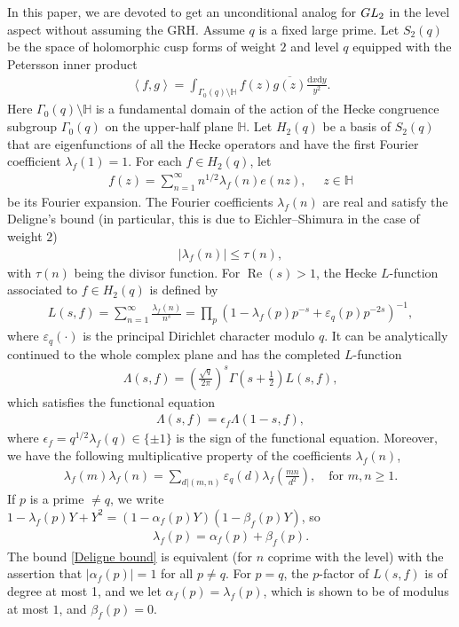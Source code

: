\documentclass[11pt,reqno]{amsart}
\newcommand{\bea}{\begin{eqnarray}}
\newcommand{\eea}{\end{eqnarray}}
\newcommand{\bna}{\begin{eqnarray*}}
\newcommand{\ena}{\end{eqnarray*}}
\numberwithin{equation}{section}
\theoremstyle{plain}
\theoremstyle{definition}
\renewcommand{\Re}{\operatorname{Re}}
\begin{document}
In this paper, we are devoted to get an unconditional analog for $\rm GL_2$ in the level aspect without assuming the GRH.
Assume $q$ is a fixed large prime.
Let $S_2(q)$ be the space of holomorphic cusp forms of weight $2$ and level $q$
equipped with the Petersson inner product
\bna
\left<f,g\right>=\int_{\Gamma_0(q)\setminus\mathbb{H}}f(z)\overline{g(z)}\frac{\mathrm{d}x\mathrm{d}y}{y^2}.
\ena
Here $\Gamma_0(q)\setminus\mathbb{H}$ is a fundamental domain of the action of the Hecke congruence subgroup
$\Gamma_0(q)$ on the upper-half plane $\mathbb{H}$.
Let $H_2(q)$ be a basis of
$S_2(q)$ that are eigenfunctions of all the Hecke operators and have the first Fourier coefficient $\lambda_f(1)=1$.
For each $f\in H_2(q)$, let
\bna
f(z)=\sum_{n=1}^\infty n^{1/2}\lambda_f(n)e(nz), \quad\,\, z\in\mathbb{H}
\ena
be its Fourier expansion.
The Fourier coefficients $\lambda_f(n)$ are real and satisfy
the Deligne's bound (in particular, this is due to Eichler--Shimura \cite{Shimura} in the case of weight $2$)
\bea\label{Deligne bound}
|\lambda_f(n)|\leq \tau(n),
\eea
with $\tau(n)$ being the divisor function.
For $\Re(s)>1$, the Hecke $L$-function associated to $f\in H_2(q)$ is defined by
\bna
L(s,f)=\sum_{n=1}^\infty\frac{\lambda_f(n)}{n^s}=\prod_p(1-\lambda_f(p)p^{-s}+\varepsilon_q(p)p^{-2s})^{-1},
\ena
where $\varepsilon_q(\cdot)$ is the principal Dirichlet character modulo $q$.
It can be analytically continued to the whole complex plane and has the completed $L$-function
\bna
\Lambda(s,f)=\left(\frac{\sqrt{q}}{2\pi}\right)^{s}
\Gamma\left(s+\frac{1}{2}\right)L(s,f),
\ena
which satisfies the functional equation
\bna\label{FE}
\Lambda(s,f)=\epsilon_f\Lambda(1-s,f),
\ena
where $\epsilon_f=q^{1/2}\lambda_f(q)\in\{\pm 1\}$ is the sign of the functional equation.
Moreover, we have the following multiplicative property of the coefficients $\lambda_f(n)$,
\bea\label{the Hecke relation}
\lambda_f(m)\lambda_f(n)
=\sum\limits_{d|(m,n)}\varepsilon_q(d)\lambda_f\left(\frac{mn}{d^2}\right),
\quad \text{for}\,\, m,n\geq 1.
\eea
If $p$ is a prime $\neq q$, we write $1-\lambda_f(p)Y+Y^2=(1-\alpha_f(p)Y)(1-\beta_f(p)Y)$,
so
\bna
\lambda_f(p)=\alpha_f(p)+\beta_f(p).
\ena
The bound \eqref{Deligne bound} is equivalent (for $n$ coprime with the level) with the assertion that $|\alpha_f(p)|=1$
for all $p\neq q$. For $p=q$, the $p$-factor of $L(s,f)$ is of degree at most 1, and we let $\alpha_f(p)=\lambda_f(p)$,
which is shown to be of modulus at most $1$, and $\beta_f(p)=0$.
\end{document}

